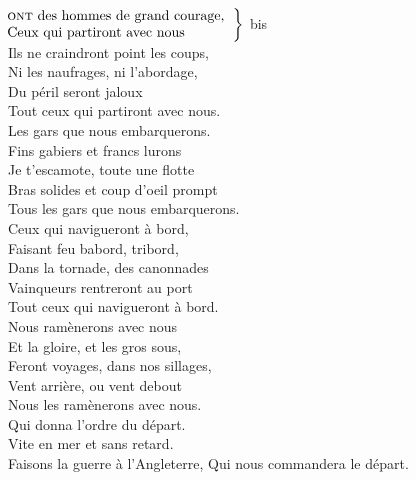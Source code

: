 \vspace{-0.3cm}
\\ 
$\left.\begin{tabular}{l}
\hspace{-0.4cm}
\textsc{ont} des hommes de grand courage,
\\
\hspace{-0.4cm}
Ceux qui partiront avec nous
\end{tabular}\right\rbrace$ bis
\\Ils ne craindront point les coups,
\\Ni les naufrages, ni l'abordage,
\\Du péril seront jaloux
\\Tout ceux qui partiront avec nous. \bissimple
\\
{Les gars que nous embarquerons.}
\\Fins gabiers et francs lurons
\\Je t'escamote, toute une flotte
\\Bras solides et coup d'oeil prompt
\\Tous les gars que nous embarquerons. \bissimple
\\
{Ceux qui navigueront à bord,}
\\Faisant feu babord, tribord,
\\Dans la tornade, des canonnades
\\Vainqueurs rentreront au port
\\Tout ceux qui navigueront à bord. \bissimple
\\
{Nous ramènerons avec nous}
\\Et la gloire, et les gros sous,
\\Feront voyages, dans nos sillages,
\\Vent arrière, ou vent debout
\\Nous les ramènerons avec nous. \bissimple
\\
{Qui donna l'ordre du départ.}
\\Vite en mer et sans retard.
\\Faisons la guerre à l'Angleterre,
{Qui nous commandera le départ.}

\breakpage
